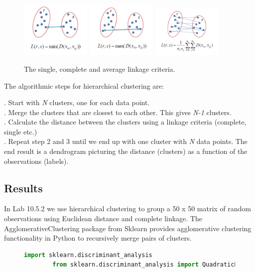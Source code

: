 \begin{figure}[H]
	\centering
	\includegraphics[width=0.3\textwidth]{clusteringMethods/hierarchicalclustering/fig/ClusteringSingle.png}
	\includegraphics[width=0.3\textwidth]{clusteringMethods/hierarchicalclustering/fig/ClusteringComplete.png}
	\includegraphics[width=0.3\textwidth]{clusteringMethods/hierarchicalclustering/fig/ClusteringAverage.png}
	\caption{The single,  complete and average linkage criteria.}
	\label{fig:linkagecriteria}
\end{figure}

\noindent The algorithmic steps for hierarchical clustering are:

. Start with \textit{N} clusters, one for each data point. \\
. Merge the clusters that are closest to each other. This gives \textit{N-1} clusters. \\
. Calculate the distance between the clusters using a linkage criteria (complete, single etc.) \\
. Repeat step 2 and 3 until we end up with one cluster with \textit{N} data points. The end result is a dendrogram picturing the distance (clusters) as a function of the observations (labels).

\subsection{Results}

In Lab 10.5.2 we use hierarchical clustering to group a 50 x 50 matrix of random observations using Euclidean distance and complete linkage. The AgglomerativeClustering package from Sklearn provides agglomerative clustering functionality in Python to recursively  merge pairs of clusters.

\begin{figure}[H]
	\begin{lstlisting}[caption=Performing AC in Python, label={lst:acpython}, language=Python]
		import sklearn.discriminant_analysis
		from sklearn.discriminant_analysis import QuadraticDiscriminantAnalysis
	\end{lstlisting}
\end{figure}
